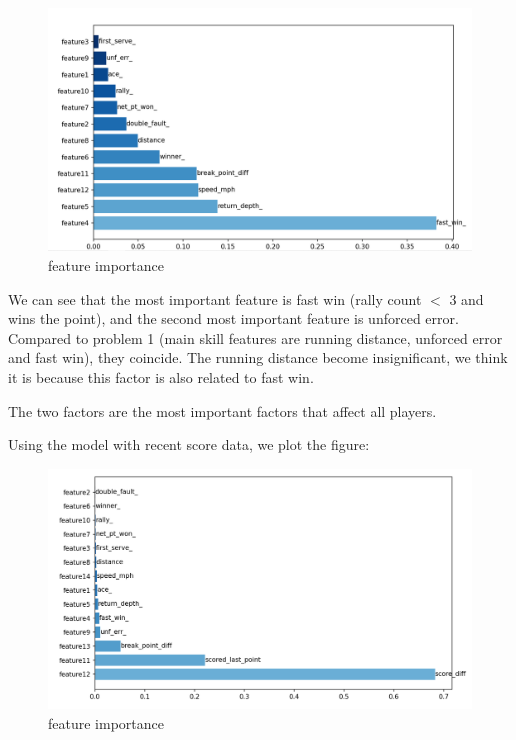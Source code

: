 \begin{figure}[H]
    \centering
    \includegraphics[scale=0.6]{mainmatter/imgs/8.png}
    \caption{feature importance}
\end{figure}

We can see that the most important feature is fast win (rally count $<$ 3 and wins the point),
and the second most important feature is unforced error. Compared to problem 1 (main skill features are
running distance, unforced error and fast win), they coincide. The running distance become insignificant, 
we think it is because this factor is also related to fast win.

The two factors are the most important factors that affect all players.

Using the model with recent score data, we plot the figure:

\begin{figure}[H]
    \centering
    \includegraphics[scale=0.6]{mainmatter/imgs/weight_with_score.jpg}
    \caption{feature importance}
\end{figure}

